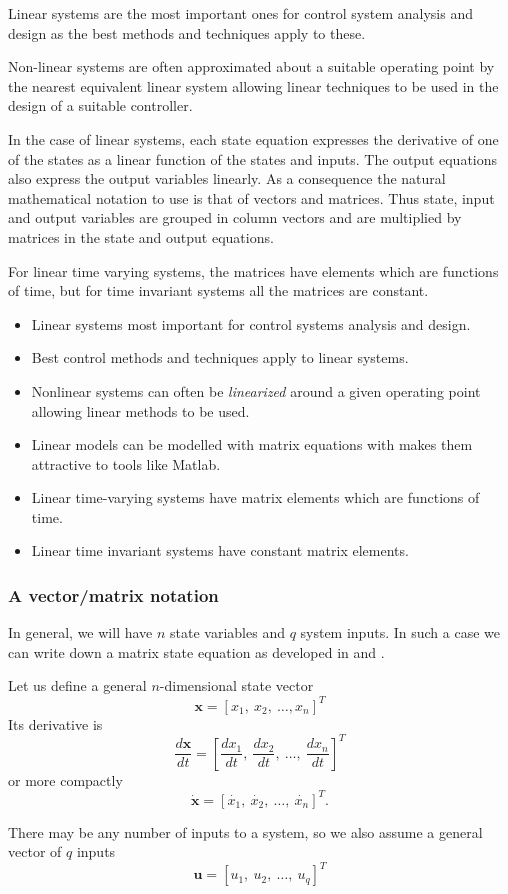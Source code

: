 Linear systems are the most important ones for control system analysis and design as the best methods and techniques apply to these.

Non-linear systems are often approximated about a suitable operating point by the nearest equivalent linear system allowing linear techniques to be used in the design of a suitable controller.

In the case of linear systems, each state equation expresses the derivative of one of the states as a linear function of the states and inputs. The output equations also express the output variables linearly. As a consequence the natural mathematical notation to use is that of vectors and matrices.
Thus state, input and output variables are grouped in column vectors and are multiplied by matrices in the state and output equations.

For linear time varying systems, the matrices have elements which are functions of time, but for time invariant systems all the matrices are constant.
\ifslidesonly
\begin{slide}
	\begin{itemize}
	 \item Linear systems most important for control systems analysis and design.
	 \item Best control methods and techniques apply to linear systems.
	 \item Nonlinear systems can often be \emph{linearized} around a given operating point allowing linear methods to be used.
	 \item Linear models can be modelled with matrix equations with makes them attractive to tools like Matlab.
	 \item Linear time-varying systems have matrix elements which are functions of time.
	 \item Linear time invariant systems have constant matrix elements.
  \end{itemize}
\end{slide}
\fi

\subsubsection*{A vector/matrix notation}

In general, we will have $n$ state variables and $q$ system
inputs. In such a case we can write down a matrix state
equation as developed in  and .
\begin{slide}\label{slides:l13s3}
 Let us define a general
$n$-dimensional state vector
\[\mathbf{x} = \left[x_1,\ x_2,\ \ldots, x_n\right]^T\] Its
derivative is
\[\frac{d\mathbf{x}}{dt} = \left[\frac{dx_1}{dt},\ \frac{dx_2}{dt},\
\ldots,\
\frac{dx_n}{dt}\right]^T\] or more compactly
\[\dot{\mathbf{x}}=\left[\dot{x_1},\ \dot{x_2},\ \ldots,\
\dot{x_n}\right]^T.\]

There may be any number of inputs to a system, so we also assume a
general vector of $q$ inputs
\[\mathbf{u}=\left[u_1,\ u_2,\ \ldots,\ u_q\right]^T\]
\end{slide}

